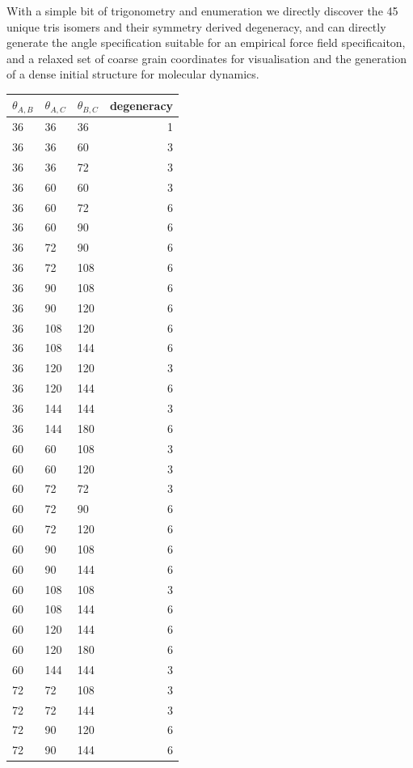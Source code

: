 \documentclass[journal=nanofd,manuscript=suppinfo]{achemso}
\begin{document}
With a simple bit of trigonometry and enumeration we directly discover the 45
unique tris isomers and their symmetry derived degeneracy, and can directly
generate the angle specification suitable for an empirical force field
specificaiton, and a relaxed set of coarse grain coordinates for visualisation
and the generation of a dense initial structure for molecular dynamics.

\begin{table}[ht!]
    \begin{tabular}{lllr}
\toprule
$\theta_{A,B}$ & $\theta_{A,C}$ & $\theta_{B,C}$ & degeneracy \\
\midrule
36 & 36 & 36 & 1 \\
36 & 36 & 60 & 3 \\
36 & 36 & 72 & 3 \\
36 & 60 & 60 & 3 \\
36 & 60 & 72 & 6 \\
36 & 60 & 90 & 6 \\
36 & 72 & 90 & 6 \\
36 & 72 & 108 & 6 \\
36 & 90 & 108 & 6 \\
36 & 90 & 120 & 6 \\
36 & 108 & 120 & 6 \\
36 & 108 & 144 & 6 \\
36 & 120 & 120 & 3 \\
36 & 120 & 144 & 6 \\
36 & 144 & 144 & 3 \\
36 & 144 & 180 & 6 \\
60 & 60 & 108 & 3 \\
60 & 60 & 120 & 3 \\
60 & 72 & 72 & 3 \\
60 & 72 & 90 & 6 \\
60 & 72 & 120 & 6 \\
60 & 90 & 108 & 6 \\
60 & 90 & 144 & 6 \\
60 & 108 & 108 & 3 \\
60 & 108 & 144 & 6 \\
60 & 120 & 144 & 6 \\
60 & 120 & 180 & 6 \\
60 & 144 & 144 & 3 \\
72 & 72 & 108 & 3 \\
72 & 72 & 144 & 3 \\
72 & 90 & 120 & 6 \\
72 & 90 & 144 & 6 \\

\end{tabular}
\end{table}
\end{document}
